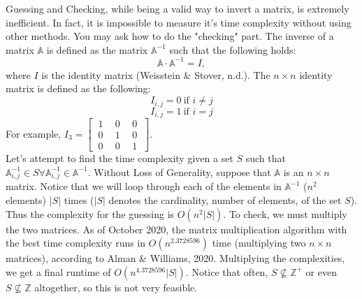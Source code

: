 \documentclass{article}
\begin{document}
\par Guessing and Checking, while being a valid way to invert a matrix, is extremely inefficient. In fact, it is impossible to measure it's time complexity without using other methods. You may ask how to do the "checking" part. The inverse of a matrix $\mathbb{A}$ is defined as the  matrix $\mathbb{A}^{-1}$ such that the following holds:
$$\mathbb{A}\cdot \mathbb{A}^{-1}=I,$$
where $I$ is the identity matrix (Weisstein \& Stover, n.d.). The $n\times n$ identity matrix is defined as the following:
$$I_{i,j}=0~\text{if } i\ne j$$
$$I_{i,j}=1~\text{if } i = j$$
For example,
$I_3=\begin{bmatrix}~1~ & ~0~ & ~0~\\ ~0~ & ~1~ & ~0~\\ ~0~ & ~0~ & ~1~\end{bmatrix}$.
\\
Let's attempt to find the time complexity given a set $S$ such that $\mathbb{A}^{-1}_{i,j}\in S\forall \mathbb{A}^{-1}_{i,j}\in\mathbb{A}^{-1}$. Without Loss of Generality, suppose that $\mathbb{A}$ is an $n\times n$ matrix. Notice that we will loop through each of the elements in $\mathbb{A}^{-1}$ ($n^2$ elements) $|S|$ times ($|S|$ denotes the cardinality, number of elements, of the set $S$). Thus the complexity for the guessing is $O(n^2|S|)$. To check, we must multiply the two matrices. As of October 2020, the matrix multiplication algorithm with the best time complexity runs in $O(n^{2.3728596})$ time (multiplying two $n\times n$ matrices), according to Alman \& Williams, 2020. Multiplying the complexities, we get a final runtime of $O(n^{4.3728596}|S|)$. Notice that often, $S\not\subseteq \mathbb{Z}^{+}$ or even $S\not\subseteq \mathbb{Z}$ altogether, so this is not very feasible. 
\end{document}
